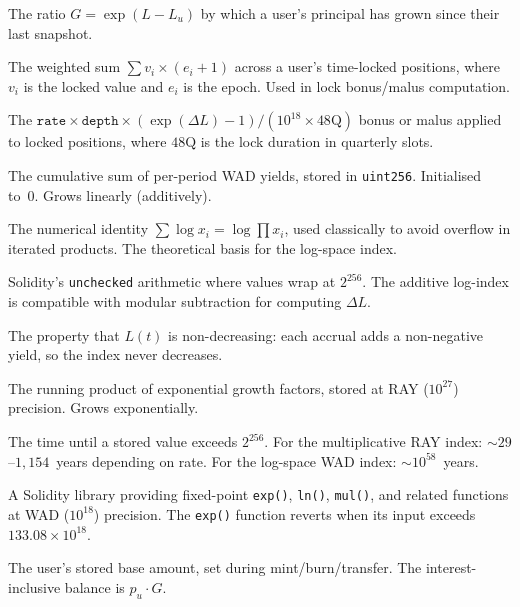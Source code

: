 \documentclass[10pt,a4paper,twocolumn]{article}
\theoremstyle{definition}
\theoremstyle{plain}
\theoremstyle{remark}
\begin{document}
\begin{description}[style=nextline, font=\normalfont\bfseries, leftmargin=1.5em]
\item[Growth Factor] The ratio $G = \exp(L - L_u)$ by which a user's principal has grown since their last snapshot.

\item[Lock Depth] The weighted sum $\sum v_i \times (e_i + 1)$ across a user's time-locked positions, where $v_i$ is the locked value and $e_i$ is the epoch. Used in lock bonus/malus computation.

\item[Lock Yield] The $\texttt{rate} \times \texttt{depth} \times (\exp(\Delta L) - 1) / (10^{18} \times 48\text{Q})$ bonus or malus applied to locked positions, where $48\text{Q}$ is the lock duration in quarterly slots.

\item[Log-Space Index ($L$)] The cumulative sum of per-period WAD yields, stored in \texttt{uint256}. Initialised to~0. Grows linearly (additively).

\item[Log-Sum-Exp] The numerical identity $\sum \log x_i = \log \prod x_i$, used classically to avoid overflow in iterated products. The theoretical basis for the log-space index.

\item[Modular Arithmetic] Solidity's \texttt{unchecked} arithmetic where values wrap at $2^{256}$. The additive log-index is compatible with modular subtraction for computing $\Delta L$.

\item[Monotonicity] The property that $L(t)$ is non-decreasing: each accrual adds a non-negative yield, so the index never decreases.

\item[Multiplicative Index ($I$)] The running product of exponential growth factors, stored at RAY ($10^{27}$) precision. Grows exponentially.

\item[Overflow Horizon] The time until a stored value exceeds $2^{256}$. For the multiplicative RAY index: ${\sim}29$--$1{,}154$~years depending on rate. For the log-space WAD index: ${\sim}10^{58}$~years.

\item[PRBMath] A Solidity library providing fixed-point \texttt{exp()}, \texttt{ln()}, \texttt{mul()}, and related functions at WAD ($10^{18}$) precision. The \texttt{exp()} function reverts when its input exceeds $133.08 \times 10^{18}$.

\item[Principal ($p_u$)] The user's stored base amount, set during mint/burn/transfer. The interest-inclusive balance is $p_u \cdot G$.


\end{description}
\end{document}
